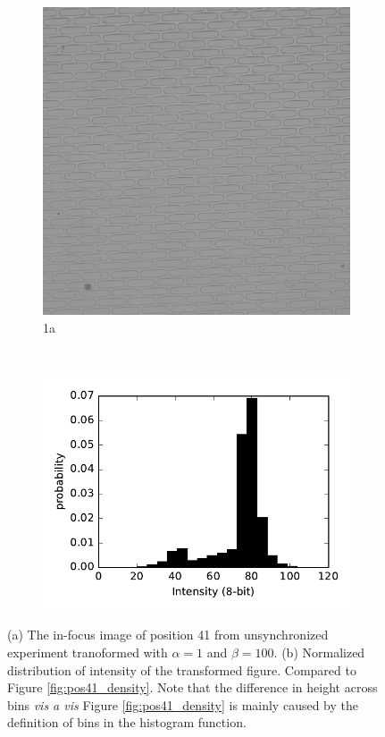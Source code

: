 \documentclass[pdftex,12pt,a4paper]{report}
\begin{document}
\begin{figure}[H]
\centering

\begin{subfigure}{0.4\textwidth}
  \centering
  \includegraphics[width=\textwidth]{images/pos_41_in_t0_br_up100}
  \caption{1a}
  \label{fig:pos41_brup100_bf}
\end{subfigure}%
~
\begin{subfigure}{0.6\textwidth}
  \centering
  \includegraphics[width=\textwidth]{images/pos_41_in_t0_br_up100_hist}
  \caption{}
  \label{fig:pos41_brup100_hist}
\end{subfigure}%

\caption{(a) The in-focus image of position 41 from unsynchronized experiment tranoformed with $\alpha=1$ and $\beta = 100$. (b) Normalized distribution of intensity of the transformed figure. Compared to Figure \ref{fig:pos41_density}. Note that the difference in height across bins \textit{vis a vis} Figure \ref{fig:pos41_density} is mainly caused by the definition of bins in the histogram function.}

\label{fig:pos41_brup100}
\end{figure}
\end{document}
